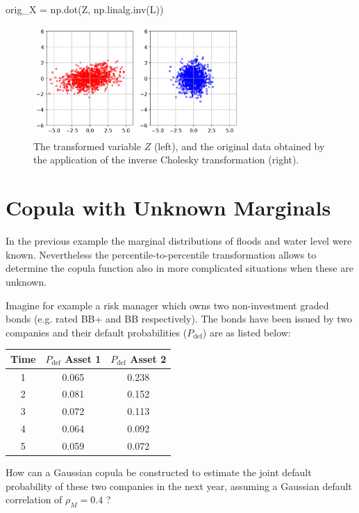 \begin{ipython}
orig_X = np.dot(Z, np.linalg.inv(L))
\end{ipython}

\begin{figure}[htbp]
  \centering
  \includegraphics[width=0.7\textwidth]{figures/cholesky_inv}
  \caption{The transformed variable $Z$ (left), and the original data obtained by the application of the inverse Cholesky transformation (right).}
  \label{fig:cholesky_inv}
\end{figure}


\section{Copula with Unknown Marginals}
In the previous example the marginal distributions of floods and water level were known. Nevertheless the percentile-to-percentile transformation allows to determine the copula function also in more complicated situations when these are unknown.

Imagine for example a risk manager which owns two non-investment graded bonds (e.g. rated BB+ and BB respectively). The bonds have been issued by two companies and their default probabilities ($P_{\mathrm{def}}$) are as listed below:

\begin{table}[htbp]
\centering
\begin{tabular}{|c|c|c|}
\hline
Time & $P_{\mathrm{def}}$ Asset 1 & $P_{\mathrm{def}}$ Asset 2 \\
\hline
\hline
1 & 0.065 & 0.238 \\
2 & 0.081 & 0.152 \\
3 & 0.072 & 0.113 \\
4 & 0.064 & 0.092 \\
5 & 0.059 & 0.072 \\
\hline
\end{tabular}
\end{table}

How can a Gaussian copula be constructed to estimate the joint default probability of these two companies in the next year, assuming a Gaussian default correlation of $\rho_M = 0.4$ ?

